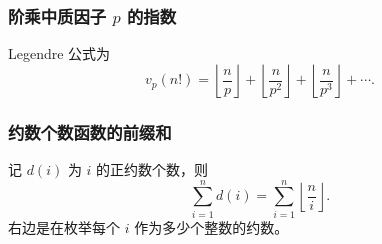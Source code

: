 \subsubsection{阶乘中质因子 $p$ 的指数}

Legendre 公式为
\[
  v_p(n!)=
  \left\lfloor\frac np\right\rfloor+
  \left\lfloor\frac n{p^2}\right\rfloor+
  \left\lfloor\frac n{p^3}\right\rfloor+\cdots.
\]

\subsubsection{约数个数函数的前缀和}

记 $d(i)$ 为 $i$ 的正约数个数，则
\[
  \sum_{i=1}^{n}d(i)
  =\sum_{i=1}^{n}\left\lfloor\frac ni\right\rfloor.
\]
右边是在枚举每个 $i$ 作为多少个整数的约数。
